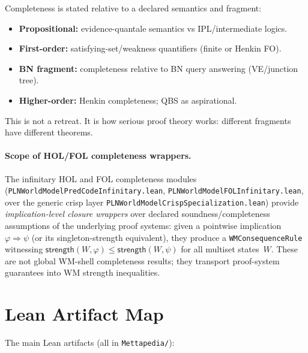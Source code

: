 \documentclass[]{article}
\newcommand{\code}[1]{\texttt{#1}}
\newcommand{\Strength}{\mathsf{strength}}
\begin{document}
Completeness is stated relative to a declared semantics and fragment:
\begin{itemize}[leftmargin=2em]
\item \textbf{Propositional:} evidence-quantale semantics vs
  IPL/intermediate logics.
\item \textbf{First-order:} satisfying-set/weakness quantifiers (finite
  or Henkin FO).
\item \textbf{BN fragment:} completeness relative to BN query answering
  (VE/junction tree).
\item \textbf{Higher-order:} Henkin completeness; QBS as aspirational.
\end{itemize}

This is not a retreat. It is how serious proof theory works: different
fragments have different theorems.

\paragraph{Scope of HOL/FOL completeness wrappers.}
The infinitary HOL and FOL completeness modules
(\code{PLNWorldModelPredCodeInfinitary.lean},
\code{PLNWorldModelFOLInfinitary.lean}, over the generic crisp layer
\code{PLNWorldModelCrispSpecialization.lean}) provide
\emph{implication-level closure wrappers} over declared
soundness/completeness assumptions of the underlying proof systems: given
a pointwise implication $\varphi \Rightarrow \psi$ (or its singleton-strength
equivalent), they produce a \code{WMConsequenceRule} witnessing
$\Strength(W,\varphi) \le \Strength(W,\psi)$ for all multiset states~$W$.
These are not global WM-shell completeness results; they transport
proof-system guarantees into WM strength inequalities.


\section{Lean Artifact Map}
\label{sec:artifacts}

The main Lean artifacts (all in \code{Mettapedia/}):
\end{document}
